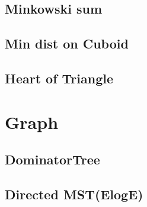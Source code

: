 \documentclass[a4paper,10pt,twocolumn,oneside]{article}
\begin{document}
\subsection{Minkowski sum}


% 

%

\subsection{Min dist on Cuboid}


\subsection{Heart of Triangle}


\section{Graph}
%

\subsection{DominatorTree}


\subsection{Directed MST(ElogE)}
%


% 
%
\end{document}
